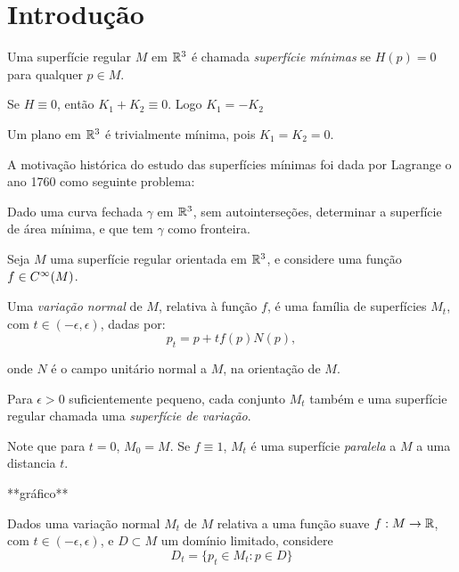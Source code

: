\section{Introdução}

\begin{definicao}
	Uma superfície regular $M$ em $\mathbb{R}^3$ é chamada \emph{superfície mínimas} se $H(p)=0$ para qualquer $p \in M$.
\end{definicao}

\begin{observacao}
	Se $H \equiv 0$, então $K_1 + K_2 \equiv 0$. Logo $K_1 = -K_2$
\end{observacao}

\begin{exemplo}
	Um plano em $\mathbb{R}^3$ é trivialmente mínima, pois $K_1=K_2=0$.
\end{exemplo}

A motivação histórica do estudo das superfícies mínimas foi dada por Lagrange o ano 1760 como seguinte problema:

Dado uma curva fechada $\gamma$ em $\mathbb{R}^3$, sem autointerseções, determinar a superfície de área mínima, e que tem $\gamma$ como fronteira.

Seja $M$ uma superfície regular orientada em $\mathbb{R}^3$, e considere uma função $f \in C^\infty(M)$.

\begin{definicao}
	Uma \emph{variação normal} de $M$, relativa à função $f$, é uma família de superfícies $M_t$, com $t \in (-\epsilon,\epsilon)$, dadas por:
	\begin{equation*}
	p_t = p + t f(p) N(p),
	\end{equation*}
	
	onde $N$ é o campo unitário normal a $M$, na orientação de $M$.
	
\end{definicao}

Para $\epsilon > 0$ suficientemente pequeno, cada conjunto $M_t$ também e uma superfície regular chamada uma \emph{superfície de variação}.

Note que para $t=0$, $M_0=M$. Se $f \equiv 1$, $M_t$ é uma superfície \emph{paralela} a $M$ a uma distancia $t$.

**gráfico**

Dados uma variação normal $M_t$ de $M$ relativa a uma função suave $f: M \rightarrow \mathbb{R}$, com $t \in (-\epsilon,\epsilon)$, e $D \subset M$ um domínio limitado, considere
\begin{equation*}
D_t = \{ p_t \in M_t: p \in D \}
\end{equation*}

